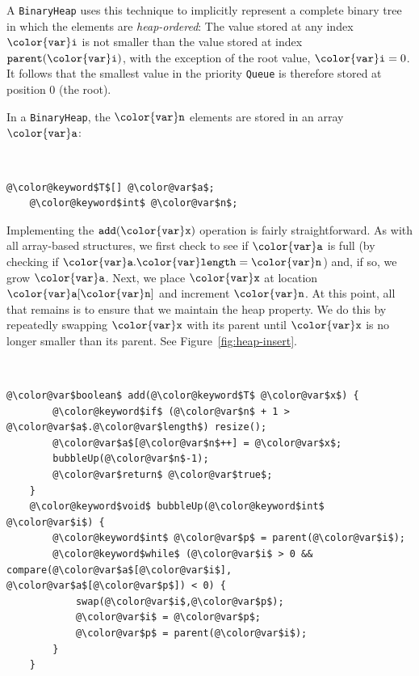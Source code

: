 \documentclass[10pt]{book}
\newcommand{\figref}[1]{Figure~\ref{fig:#1}}
\theoremstyle{plain}
\theoremstyle{definition}
\begin{document}
A \texttt{BinaryHeap} uses this technique to implicitly represent a complete
binary tree in which the elements are \emph{heap-ordered}:
%
%
%
The value
stored at any index \ensuremath{\mathtt{{\color{var}i}}} is not smaller than the value stored at index
\ensuremath{\mathtt{parent({\color{var}i})}}, with the exception of the root value, $\ensuremath{\mathtt{{\color{var}i}}}=0$.  It follows
that the smallest value in the priority \texttt{Queue} is therefore stored at
position 0 (the root).

In a \texttt{BinaryHeap}, the \ensuremath{\mathtt{{\color{var}n}}} elements are stored in an array \ensuremath{\mathtt{{\color{var}a}}}:


 \ \vspace{.5ex}\begin{Verbatim}[gobble=1,tabsize=2,frame=single,framerule=1.2pt,commandchars=\\@\$,label=\texttt{BinaryHeap},labelposition=topline]
	@\color@keyword$T$[] @\color@var$a$;
	@\color@keyword$int$ @\color@var$n$;
\end{Verbatim}


Implementing the \ensuremath{\mathtt{add({\color{var}x})}} operation is fairly straightforward.  As with
all array-based structures, we first check to see if \ensuremath{\mathtt{{\color{var}a}}} is full (by checking if $\ensuremath{\mathtt{{\color{var}a}.{\color{var}length}}}=\ensuremath{\mathtt{{\color{var}n}}}$) and, if so, we grow \ensuremath{\mathtt{{\color{var}a}}}.  Next, we place \ensuremath{\mathtt{{\color{var}x}}} at location
\ensuremath{\mathtt{{\color{var}a}[{\color{var}n}]}} and increment \ensuremath{\mathtt{{\color{var}n}}}.  At this point, all that remains is to ensure
that we maintain the heap property.  We do this by repeatedly swapping
\ensuremath{\mathtt{{\color{var}x}}} with its parent until \ensuremath{\mathtt{{\color{var}x}}} is no longer smaller than its parent.
See \figref{heap-insert}.


 \ \vspace{.5ex}\begin{Verbatim}[gobble=1,tabsize=2,frame=single,framerule=1.2pt,commandchars=\\@\$,label=\texttt{BinaryHeap},labelposition=topline]
	@\color@var$boolean$ add(@\color@keyword$T$ @\color@var$x$) {
		@\color@keyword$if$ (@\color@var$n$ + 1 > @\color@var$a$.@\color@var$length$) resize();
		@\color@var$a$[@\color@var$n$++] = @\color@var$x$;
		bubbleUp(@\color@var$n$-1);
		@\color@var$return$ @\color@var$true$;
	}
	@\color@keyword$void$ bubbleUp(@\color@keyword$int$ @\color@var$i$) {
		@\color@keyword$int$ @\color@var$p$ = parent(@\color@var$i$);
		@\color@keyword$while$ (@\color@var$i$ > 0 && compare(@\color@var$a$[@\color@var$i$], @\color@var$a$[@\color@var$p$]) < 0) {
			swap(@\color@var$i$,@\color@var$p$);
			@\color@var$i$ = @\color@var$p$;
			@\color@var$p$ = parent(@\color@var$i$);
		}
	}
\end{Verbatim}
\end{document}
